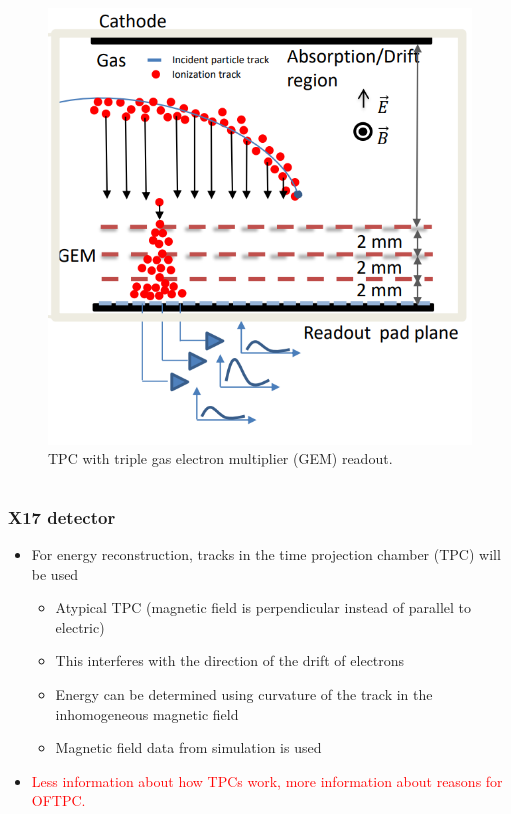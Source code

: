 \documentclass{beamer}
\begin{document}
\begin{frame}
\begin{itemize}
\begin{columns}
\begin{figure}
\begin{minipage}[t][4.3cm]{\textwidth}
						\includegraphics[width=0.81\linewidth]{../images/diagram2.png}\newline
					\end{minipage}
					\caption{TPC with triple gas electron multiplier (GEM) readout.\cite{poster}}
					\label{fig:dia2}
				\end{figure}
				\end{columns}
		\end{itemize}
	\end{frame}

	\begin{frame}
		\frametitle{X17 detector}
		\begin{itemize}
			\item For energy reconstruction, tracks in the time projection chamber (TPC) will be used
			\begin{itemize}
				\item Atypical TPC (magnetic field is perpendicular instead of parallel to electric)
				\item This interferes with the direction of the drift of electrons
				\item Energy can be determined using curvature of the track in the inhomogeneous magnetic field
				\item Magnetic field data from simulation is used
			\end{itemize}
			\item \textcolor{red}{Less information about how TPCs work, more information about reasons for OFTPC.}
		\end{itemize}
	\end{frame}
	
\end{document}
